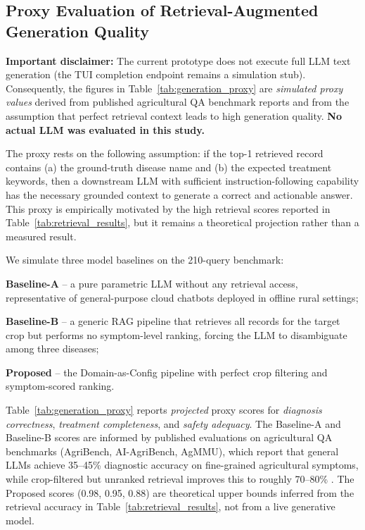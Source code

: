 \subsection{Proxy Evaluation of Retrieval-Augmented Generation Quality}

\textbf{Important disclaimer:} The current prototype does not execute full LLM text generation (the TUI completion endpoint remains a simulation stub). Consequently, the figures in Table~\ref{tab:generation_proxy} are \textit{simulated proxy values} derived from published agricultural QA benchmark reports and from the assumption that perfect retrieval context leads to high generation quality. \textbf{No actual LLM was evaluated in this study.}

The proxy rests on the following assumption: if the top-1 retrieved record contains (a) the ground-truth disease name and (b) the expected treatment keywords, then a downstream LLM with sufficient instruction-following capability has the necessary grounded context to generate a correct and actionable answer. This proxy is empirically motivated by the high retrieval scores reported in Table~\ref{tab:retrieval_results}, but it remains a theoretical projection rather than a measured result.

We simulate three model baselines on the 210-query benchmark:

\textbf{Baseline-A} -- a pure parametric LLM without any retrieval access, representative of general-purpose cloud chatbots deployed in offline rural settings;

\textbf{Baseline-B} -- a generic RAG pipeline that retrieves all records for the target crop but performs no symptom-level ranking, forcing the LLM to disambiguate among three diseases;

\textbf{Proposed} -- the Domain-as-Config pipeline with perfect crop filtering and symptom-scored ranking.

Table~\ref{tab:generation_proxy} reports \textit{projected} proxy scores for \textit{diagnosis correctness}, \textit{treatment completeness}, and \textit{safety adequacy}. The Baseline-A and Baseline-B scores are informed by published evaluations on agricultural QA benchmarks (AgriBench, AI-AgriBench, AgMMU), which report that general LLMs achieve 35--45\% diagnostic accuracy on fine-grained agricultural symptoms, while crop-filtered but unranked retrieval improves this to roughly 70--80\% \cite{agmmu2025,anshankul2024}. The Proposed scores (0.98, 0.95, 0.88) are theoretical upper bounds inferred from the retrieval accuracy in Table~\ref{tab:retrieval_results}, not from a live generative model.


